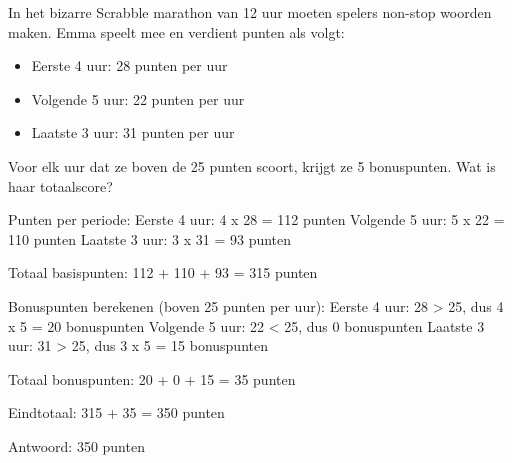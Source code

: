\begin{opgave}
In het bizarre Scrabble marathon van 12 uur moeten spelers non-stop woorden 
maken. Emma speelt mee en verdient punten als volgt:
\begin{itemize}
\item Eerste 4 uur: 28 punten per uur
\item Volgende 5 uur: 22 punten per uur  
\item Laatste 3 uur: 31 punten per uur
\end{itemize}
Voor elk uur dat ze boven de 25 punten scoort, krijgt ze 5 bonuspunten. Wat 
is haar totaalscore?
\end{opgave}

\begin{oplossing}
Punten per periode:
Eerste 4 uur: 4 x 28 = 112 punten
Volgende 5 uur: 5 x 22 = 110 punten
Laatste 3 uur: 3 x 31 = 93 punten

Totaal basispunten:
112 + 110 + 93 = 315 punten

Bonuspunten berekenen (boven 25 punten per uur):
Eerste 4 uur: 28 > 25, dus 4 x 5 = 20 bonuspunten
Volgende 5 uur: 22 < 25, dus 0 bonuspunten
Laatste 3 uur: 31 > 25, dus 3 x 5 = 15 bonuspunten

Totaal bonuspunten: 20 + 0 + 15 = 35 punten

Eindtotaal: 315 + 35 = 350 punten

Antwoord: 350 punten
\end{oplossing}